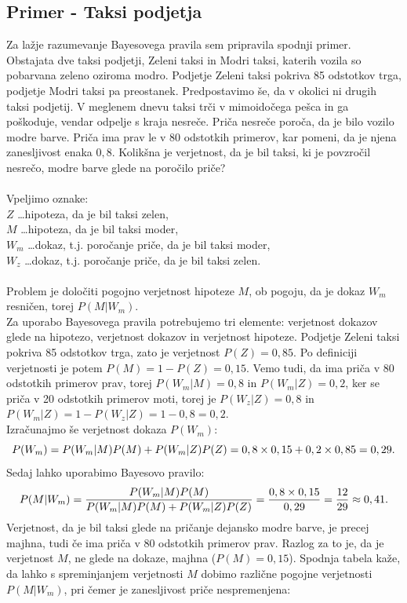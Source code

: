 \documentclass[fin1, tisk]{fmfdelo}
\theoremstyle{definition}
\theoremstyle{trditev}
\theoremstyle{izrek}
\begin{document}
\subsection{Primer - Taksi podjetja}
Za lažje razumevanje Bayesovega pravila sem pripravila spodnji primer. \\
Obstajata dve taksi podjetji, Zeleni taksi in Modri taksi, katerih vozila so pobarvana zeleno oziroma modro. Podjetje Zeleni taksi pokriva
85 odstotkov trga, podjetje Modri taksi pa preostanek. Predpostavimo še, da v okolici ni drugih taksi podjetij. V meglenem dnevu taksi trči
v mimoidočega pešca in ga poškoduje, vendar odpelje s kraja nesreče. Priča nesreče poroča, da je bilo vozilo modre barve. Priča ima prav le
v 80 odstotkih primerov, kar pomeni, da je njena zanesljivost enaka $0,8$. Kolikšna je verjetnost, da je bil taksi, ki je povzročil nesrečo,
modre barve glede na poročilo priče? \\\\
Vpeljimo oznake:\\
$Z$ \dots hipoteza, da je bil taksi zelen, \\
$M$ \dots hipoteza, da je bil taksi moder, \\
$W_m$ \dots dokaz, t.j. poročanje priče, da je bil taksi moder,\\
$W_z$ \dots dokaz, t.j. poročanje priče, da je bil taksi zelen. \\\\
Problem je določiti pogojno verjetnost hipoteze $M$, ob pogoju, da je dokaz $W_m$ resničen, torej $P(M \lvert W_m)$. \\
Za uporabo Bayesovega pravila potrebujemo tri elemente: verjetnost dokazov glede na hipotezo, verjetnost dokazov in verjetnost hipoteze. Podjetje
Zeleni taksi pokriva 85 odstotkov trga, zato je verjetnost $P(Z)=0,85$. Po definiciji verjetnosti je potem $P(M)=1-P(Z)=0,15$. Vemo tudi, da ima
priča v 80 odstotkih primerov prav, torej $P(W_m \lvert M) = 0,8$ in $P(W_m \lvert Z) = 0,2$, ker se priča v 20 odstotkih primerov moti, torej je 
$P(W_z \lvert Z) = 0,8$ in $P(W_m \lvert Z) = 1 - P(W_z \lvert Z) = 1 - 0,8 = 0,2$.\\
Izračunajmo še verjetnost dokaza $P(W_m)$:
\[
    P(W_m) = P(W_m \lvert M)P(M) + P(W_m \lvert Z)P(Z)= 0,8 \times 0,15 + 0,2 \times 0,85 = 0,29. \vspace{2mm}
\]
Sedaj lahko uporabimo Bayesovo pravilo:
\[
    P(M \lvert W_m)= \frac{P(W_m \lvert M)P(M)}{P(W_m \lvert M)P(M) + P(W_m \lvert Z)P(Z)} = \frac{0,8 \times 0,15}{0,29} = \frac{12}{29} \approx 0,41. \vspace{2mm}
\]
Verjetnost, da je bil taksi glede na pričanje dejansko modre barve, je precej majhna, tudi če ima priča v 80 odstotkih primerov prav. Razlog za to je,
da je verjetnost $M$, ne glede na dokaze, majhna ($P(M)=0,15$). Spodnja tabela kaže, da lahko s spreminjanjem verjetnosti $M$ dobimo različne pogojne
verjetnosti $P(M \lvert W_m)$, pri čemer je zanesljivost priče nespremenjena:
\end{document}
